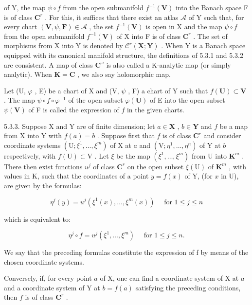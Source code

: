 of Y, the map \(\psi \circ f\) from the open submanifold \(f^{-1}(\mathbf{V})\) into the Banach space F is of class \(\mathbf{C}^{r}\) . For this, it suffices that there exist an atlas \(\mathcal{A}\) of Y such that, for every chart \((\mathbf{V}, \psi, \mathbf{F}) \in \mathcal{A}\) , the set \(f^{-1}(\mathbf{V})\) is open in X and the map \(\psi \circ f\) from the open submanifold \(f^{-1}(\mathbf{V})\) of X into F is of class \(\mathbf{C}^{r}\) . The set of morphisms from X into Y is denoted by \(\mathcal{C}^{r}(\mathbf{X}; \mathbf{Y})\) . When Y is a Banach space equipped with its canonical manifold structure, the definitions of 5.3.1 and 5.3.2 are consistent. A map of class \(\mathbf{C}^{\omega}\) is also called a K-analytic map (or simply analytic). When \(\mathbf{K} = \mathbf{C}\) , we also say holomorphic map.

Let (U, \(\varphi\) , E) be a chart of X and (V, \(\psi\) , F) a chart of Y such that \(f(\mathbf{U}) \subset \mathbf{V}\) . The map \(\psi \circ f \circ \varphi^{-1}\) of the open subset \(\varphi(\mathbf{U})\) of E into the open subset \(\psi(\mathbf{V})\) of F is called the expression of \(f\) in the given charts.

5.3.3. Suppose X and Y are of finite dimension; let \(a \in \mathbf{X}\) , \(b \in \mathbf{Y}\) and \(f\) be a map from X into Y with \(f(a) = b\) . Suppose first that \(f\) is of class \(\mathbf{C}^r\) and consider coordinate systems \((\mathrm{U}; \xi^1, \ldots, \xi^m)\) of X at \(a\) and \((\mathrm{V}; \eta^1, \ldots, \eta^n)\) of Y at \(b\) respectively, with \(f(\mathrm{U}) \subset \mathrm{V}\) . Let \(\xi\) be the map \((\xi^1, \ldots, \xi^m)\) from U into \(\mathbf{K}^m\) . There then exist functions \(u^j\) of class \(\mathbf{C}^r\) on the open subset \(\xi(\mathrm{U})\) of \(\mathbf{K}^m\) , with values in K, such that the coordinates of a point \(y = f(x)\) of Y, (for \(x\) in U), are given by the formulas:

\[
\eta^ {j} (y) = u ^ {j} (\xi^ {1} (x), \dots , \xi^ {m} (x)) \quad \text { for } 1 \leqslant j \leqslant n\tag{1}
\]

which is equivalent to:

\[
\eta^ {j} \circ f = u ^ {j} (\xi^ {1}, \dots , \xi^ {m}) \quad \text { for } 1 \leqslant j \leqslant n.\tag{2}
\]

We say that the preceding formulas constitute the expression of f by means of the chosen coordinate systems.

Conversely, if, for every point \(a\) of X, one can find a coordinate system of X at \(a\) and a coordinate system of Y at \(b = f(a)\) satisfying the preceding conditions, then \(f\) is of class \(\mathbf{C}^{r}\) .

